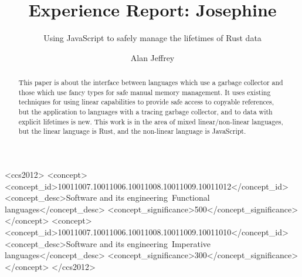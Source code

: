 \documentclass[acmsmall]{acmart}
\begin{document}
\title{Experience Report: Josephine}
\subtitle{Using JavaScript to safely manage the lifetimes of Rust data}

\author{Alan Jeffrey}

\begin{abstract}
This paper is about the interface between languages
which use a garbage collector and those which use fancy
types for safe manual memory management.
It uses existing techniques for using linear capabilities
to provide safe access to copyable references,
but the application to languages
with a tracing garbage collector,
and to data with explicit lifetimes is new.
This work is in the area of mixed linear/non-linear
languages, but the linear language is Rust, and the
non-linear language is JavaScript.
\end{abstract}

\begin{CCSXML}
<ccs2012>
<concept>
<concept_id>10011007.10011006.10011008.10011009.10011012</concept_id>
<concept_desc>Software and its engineering~Functional languages</concept_desc>
<concept_significance>500</concept_significance>
</concept>
<concept>
<concept_id>10011007.10011006.10011008.10011009.10011010</concept_id>
<concept_desc>Software and its engineering~Imperative languages</concept_desc>
<concept_significance>300</concept_significance>
</concept>
</ccs2012>
\end{CCSXML}



\maketitle








\end{document}
